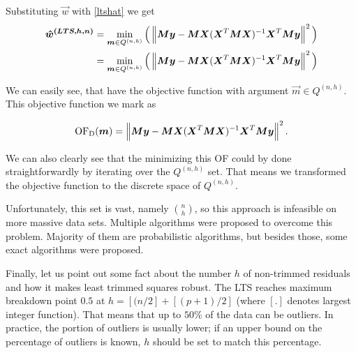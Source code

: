 Substituting $\vec{w}$ with \eqref{ltshat} we get
\begin{align*}
\boldsymbol{\hat{w}^{(LTS, h, n)}}
&=  \operatorname*{min}_{\boldsymbol{m} \in Q^{(n,h)}} 
    \Big( \left\lVert \boldsymbol{M}\boldsymbol{y} -  \boldsymbol{M}\boldsymbol{X}(\boldsymbol{X}^T\boldsymbol{M}\boldsymbol{X})^{-1}\boldsymbol{X}^T\boldsymbol{M}\boldsymbol{y}  \right\rVert^2 \Big)\\
&= \operatorname*{min}_{\boldsymbol{m} \in Q^{(n,h)}} 
    \Big( \left\lVert \boldsymbol{M}\boldsymbol{y} -  \boldsymbol{M}\boldsymbol{X}(\boldsymbol{X}^T\boldsymbol{M}\boldsymbol{X})^{-1}\boldsymbol{X}^T\boldsymbol{M}\boldsymbol{y}  \right\rVert^2 \Big)
\end{align*}

We can easily see, that have the objective function with argument $\vec{m} \in Q^{(n,h)}$. This objective function we mark as

\begin{equation} \label{oflts_discrete}
    \operatorname{OF_D}(\boldsymbol{m}) =  \left\lVert \boldsymbol{M}\boldsymbol{y} -  \boldsymbol{M}\boldsymbol{X}(\boldsymbol{X}^T\boldsymbol{M}\boldsymbol{X})^{-1}\boldsymbol{X}^T\boldsymbol{M}\boldsymbol{y}  \right\rVert^2.
\end{equation}

We can also clearly see that the minimizing this OF could by done straightforwardly by iterating over the $Q^{(n,h)}$ set. That means we transformed the objective function to the discrete space of $Q^{(n,h)}$.

Unfortunately, this set is vast, namely $\binom{n}{h}$, so this approach is infeasible on more massive data sets. Multiple algorithms were proposed to overcome this problem. Majority of them are probabilistic algorithms, but besides those, some exact algorithms were proposed. 

Finally, let us point out some fact about the number $h$ of non-trimmed residuals and how it makes least trimmed squares robust.
The LTS reaches maximum breakdown point $0.5$ at $h = [(n/2] + [(p+1)/2]$ \cite{agullo2001new}(where $[.]$ denotes largest integer function).
That means that up to $50\%$ of the data can be outliers. In practice, the portion of outliers is usually lower; if an upper bound on the percentage of outliers is known,  $h$ should be set to match this percentage.